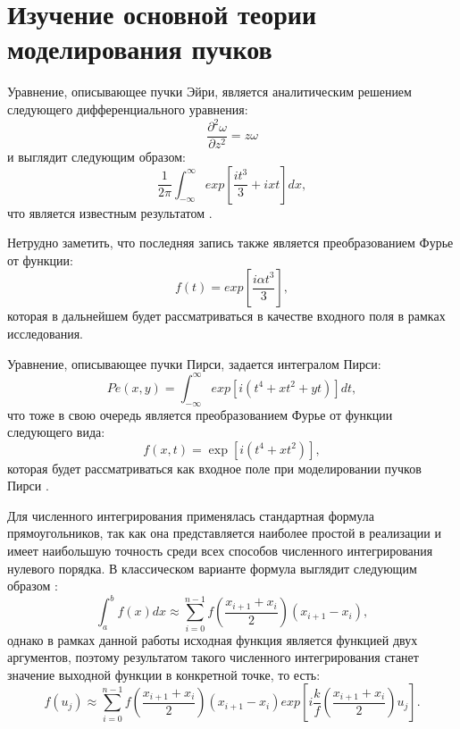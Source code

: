 \section{Изучение основной теории моделирования пучков}
{
Уравнение, описывающее пучки Эйри, является аналитическим решением
следующего дифференциального уравнения:
	\begin{equation*} \label{}
	\frac{\partial^2 \omega}{\partial z^2} = z \omega
	\end{equation*}
	и выглядит следующим образом:
	\begin{equation*} \label{}
	\frac{1 }{2 \pi}\int_{- \infty}^{\infty} exp[{\frac{it^3}{3} + ixt}]dx,
	\end{equation*}
что является известным результатом \cite{Khonina_2011, math_func}.
	
Нетрудно заметить, что последняя запись также является
преобразованием Фурье от функции:
		\begin{equation*} \label{}
	f(t) = exp[\frac{i \alpha t^3}{3}],
		\end{equation*}
которая в дальнейшем будет рассматриваться в качестве входного поля в
рамках исследования.

Уравнение, описывающее пучки Пирси, задается интегралом Пирси:
			\begin{equation*} \label{}
	Pe(x, y)  = \int_{-\infty}^{\infty}exp[i(t^4 + xt^2 +yt)]dt,
		\end{equation*}
что тоже в свою очередь является преобразованием Фурье от функции
следующего вида:
\begin{equation*} \label{}
	f(x, t)  = \exp[i(t^4 + xt^2)],
		\end{equation*}
которая будет рассматриваться как входное поле при моделировании пучков
Пирси \cite{pe_art}.

Для численного интегрирования применялась стандартная формула
прямоугольников, так как она представляется наиболее простой в реализации и
имеет наибольшую точность среди всех способов численного интегрирования
нулевого порядка. В классическом варианте формула выглядит следующим
образом \cite{samarsky}:
\begin{equation*} \label{}
\int_a^b{f(x)dx} \approx \sum_{i=0}^{n-1} f(\frac{x_{i+1} + x_i}{2})(x_{i+1} - x_i),
		\end{equation*}
однако в рамках данной работы исходная функция является функцией двух аргументов,
поэтому результатом такого численного интегрирования станет значение
выходной функции в конкретной точке, то есть:
\begin{equation*} \label{}
 f(u_j) \approx \sum_{i=0}^{n-1}f(\frac{x_{i+1}+x_i}{2})(x_{i+1} - x_i) exp[i \frac{k}{f}(\frac{x_{i+1}+x_i}{2})u_j].
		\end{equation*}
		
}
